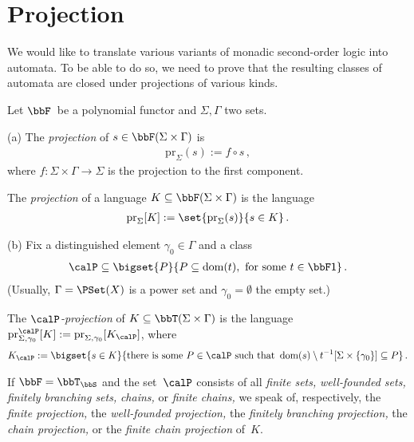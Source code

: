 \documentclass[10pt, fleqn]{scrartcl}
\DeclareRobustCommand*{\dom}{\qopname\relax o{dom}}
\newcommand*{\pr}{\mathrm{pr}}
\newcommand*{\one}{\textsf{1}}
\newcommand*{\?}{\kern .08em}
\begin{document}
\section{Projection}   %
\label{Sect: projection}


We would like to translate various variants of monadic second-order logic into automata.
To be able to do so, we need to prove that the resulting classes of
automata are closed under projections of various kinds.
\begin{Def}\label{Def: projection}
Let $\bbF$~be a polynomial functor and $\Sigma,\Gamma$ two sets.

(a)
The \emph{projection} of $s \in \bbF(\Sigma \times \Gamma)$ is
\begin{align*}
  \pr_\Sigma(s) := f \circ s\,,
\end{align*}
where $f : \Sigma \times \Gamma \to \Sigma$ is the projection to the first component.

The \emph{projection} of a language $K \subseteq \bbF(\Sigma \times \Gamma)$
is the language
\begin{align*}
  \pr_\Sigma[K] := \set{ \pr_\Sigma(s) }{ s \in K }\,.
\end{align*}

(b)
Fix a distinguished element $\gamma_0 \in \Gamma$ and a class
\begin{align*}
  \calP \subseteq
    \bigset{ P }{ P \subseteq \dom(t), \text{ for some } t \in \bbF\one }\,.
\end{align*}
(Usually, $\Gamma = \PSet(X)$ is a power set and $\gamma_0 = \emptyset$ the empty set.)

The \emph{$\calP$-projection} of $K \subseteq \bbT(\Sigma \times \Gamma)$ is the language
$\pr^\calP_{\Sigma,\gamma_0}[K] := \pr_{\Sigma,\gamma_0}[K_\calP]$,
where
\begin{align*}
  K_\calP :=
    \bigset{ s \in K }
           { \text{there is some } P \in \calP \text{ such that }
             \dom(s) \setminus t^{-1}[\Sigma \times \{\gamma_0\}] \subseteq P }\,.
\end{align*}

If $\bbF = \bbT_\bbS$ and the set~$\calP$ consists of all
\emph{finite sets,} \emph{well-founded sets,}
\emph{finitely branching sets,} \emph{chains,} or \emph{finite chains,} we speak of,
respectively, the \emph{finite projection,} the \emph{well-founded projection,}
the \emph{finitely branching projection,} the \emph{chain projection,} or the
\emph{finite chain projection} of~$K$.


\end{Def}
\end{document}
